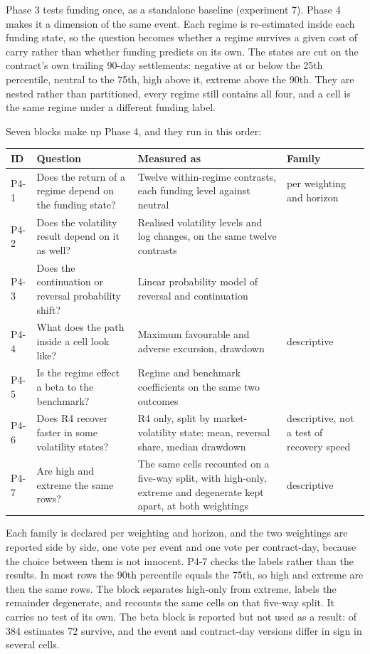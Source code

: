 \documentclass[11pt,a4paper]{article}
\begin{document}
Phase 3 tests funding once, as a standalone baseline (experiment 7). Phase 4 makes it a dimension of the same event. Each regime is re-estimated inside each funding state, so the question becomes whether a regime survives a given cost of carry rather than whether funding predicts on its own. The states are cut on the contract's own trailing 90-day settlements: negative at or below the 25th percentile, neutral to the 75th, high above it, extreme above the 90th. They are nested rather than partitioned, every regime still contains all four, and a cell is the same regime under a different funding label.

Seven blocks make up Phase 4, and they run in this order:

\begin{table}[H]\centering
\footnotesize
\begin{tabularx}{\linewidth}{>{\raggedright\arraybackslash}X>{\raggedright\arraybackslash}X>{\raggedright\arraybackslash}X>{\raggedright\arraybackslash}X}
\toprule
ID & Question & Measured as & Family \\
\midrule
P4-1 & Does the return of a regime depend on the funding state? & Twelve within-regime contrasts, each funding level against neutral & 12 per weighting and horizon \\
P4-2 & Does the volatility result depend on it as well? & Realised volatility levels and log changes, on the same twelve contrasts & 12 \\
P4-3 & Does the continuation or reversal probability shift? & Linear probability model of reversal and continuation & 12 \\
P4-4 & What does the path inside a cell look like? & Maximum favourable and adverse excursion, drawdown & descriptive \\
P4-5 & Is the regime effect a beta to the benchmark? & Regime and benchmark coefficients on the same two outcomes & 16 \\
P4-6 & Does R4 recover faster in some volatility states? & R4 only, split by market-volatility state: mean, reversal share, median drawdown & descriptive, not a test of recovery speed \\
P4-7 & Are high and extreme the same rows? & The same cells recounted on a five-way split, with high-only, extreme and degenerate kept apart, at both weightings & descriptive \\
\bottomrule
\end{tabularx}
\end{table}

Each family is declared per weighting and horizon, and the two weightings are reported side by side, one vote per event and one vote per contract-day, because the choice between them is not innocent. P4-7 checks the labels rather than the results. In most rows the 90th percentile equals the 75th, so high and extreme are then the same rows. The block separates high-only from extreme, labels the remainder degenerate, and recounts the same cells on that five-way split. It carries no test of its own. The beta block is reported but not used as a result: of 384 estimates 72 survive, and the event and contract-day versions differ in sign in several cells.
\end{document}
